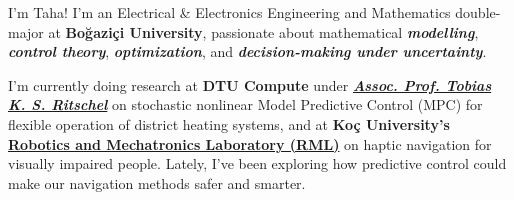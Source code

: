 


\begin{About}
I'm Taha! I'm an Electrical \& Electronics Engineering and Mathematics double-major at \textbf{Boğaziçi University}, passionate about mathematical \textbf{\textit{modelling}}, \textbf{\textit{control theory}}, \textbf{\textit{optimization}}, and \textbf{\textit{decision-making under uncertainty}}.

I'm currently doing research at \textbf{DTU Compute} under \href{https://people.compute.dtu.dk/tobk/index.html}{\textbf{\textit{Assoc. Prof. Tobias K. S. Ritschel}}} on stochastic nonlinear Model Predictive Control (MPC) for flexible operation of district heating systems, and at \textbf{Koç University's \href{https://research.ku.edu.tr/research-infrastructure/laboratories/rml/}{Robotics and Mechatronics Laboratory (RML)}} on haptic navigation for visually impaired people. Lately, I've been exploring how predictive control could make our navigation methods safer and smarter.
\end{About}
